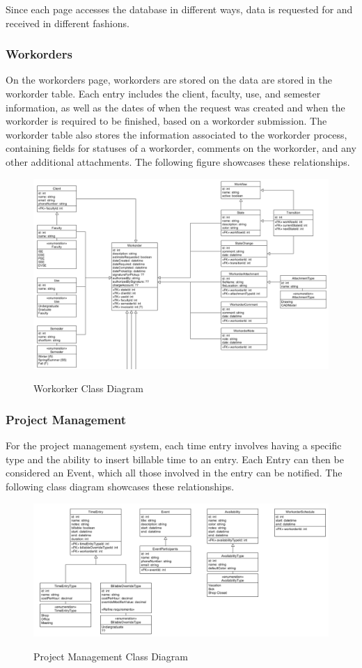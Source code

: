 {{{{{{{Since each page accesses the database in different ways, data is requested for and received in different fashions. 
\subsubsection{Workorders}
On the workorders page, workorders are stored on the data are stored in the workorder table. Each entry includes the client, faculty, use, and semester information, as well as the dates of when the request was created and when the workorder is required to be finished, based on a workorder submission. The workorder table also stores the information associated to the workorder process, containing fields for statuses of a workorder, comments on the workorder, and any other additional attachments. The following figure showcases these relationships. 
\begin{figure}[H]
	\centering
	\includegraphics[width=5in]{workorder.png}\\
	\caption{Workorker Class Diagram}
	\label{fig:tobias}
\end{figure}

\subsubsection{Project Management}
For the project management system, each time entry involves having a specific type and the ability to insert billable time to an entry. Each Entry can then be considered an Event, which all those involved in the entry can be notified. The following class diagram showcases these relationships. 
\begin{figure}[H]
	\centering
	\includegraphics[width=5in]{project-management.png}\\
	\caption{Project Management Class Diagram}
	\label{fig:tobias}
\end{figure}

}}}}}}}
